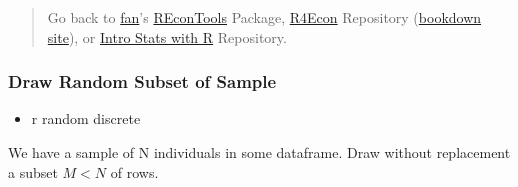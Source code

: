\documentclass[
]{book}
\newenvironment{Shaded}{\begin{snugshade}}{\end{snugshade}}
\newcommand{\CommentTok}[1]{\textcolor[rgb]{0.56,0.35,0.01}{\textit{#1}}}
\newcommand{\DataTypeTok}[1]{\textcolor[rgb]{0.13,0.29,0.53}{#1}}
\newcommand{\DecValTok}[1]{\textcolor[rgb]{0.00,0.00,0.81}{#1}}
\newcommand{\KeywordTok}[1]{\textcolor[rgb]{0.13,0.29,0.53}{\textbf{#1}}}
\newcommand{\NormalTok}[1]{#1}
\newcommand{\OperatorTok}[1]{\textcolor[rgb]{0.81,0.36,0.00}{\textbf{#1}}}
\newcommand{\OtherTok}[1]{\textcolor[rgb]{0.56,0.35,0.01}{#1}}
\newcommand{\StringTok}[1]{\textcolor[rgb]{0.31,0.60,0.02}{#1}}
\providecommand{\tightlist}{%
  \setlength{\itemsep}{0pt}\setlength{\parskip}{0pt}}
\begin{document}
\begin{quote}
Go back to \href{http://fanwangecon.github.io/}{fan}'s \href{https://fanwangecon.github.io/REconTools/}{REconTools} Package, \href{https://fanwangecon.github.io/R4Econ/}{R4Econ} Repository (\href{https://fanwangecon.github.io/R4Econ/bookdown}{bookdown site}), or \href{https://fanwangecon.github.io/Stat4Econ/}{Intro Stats with R} Repository.
\end{quote}

\hypertarget{draw-random-subset-of-sample}{%
\subsubsection{Draw Random Subset of Sample}\label{draw-random-subset-of-sample}}

\begin{itemize}
\tightlist
\item
  r random discrete
\end{itemize}

We have a sample of N individuals in some dataframe. Draw without replacement a subset \(M<N\) of rows.

\begin{Shaded}
\end{Shaded}
\end{document}

